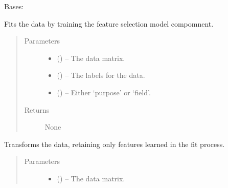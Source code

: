 \documentclass[letterpaper,10pt,english]{sphinxmanual}
\begin{document}
\begin{fulllineitems}
\label{\detokenize{KUHERD:KUHERD.FeatureSelector.FeatureSelector}}
Bases: 

\begin{fulllineitems}
\label{\detokenize{KUHERD:KUHERD.FeatureSelector.FeatureSelector.fit}}
Fits the data by training the feature selection model compomnent.
\begin{quote}\begin{description}
\item[{Parameters}] \leavevmode\begin{itemize}
\item {} 
 () -- The data matrix.

\item {} 
 () -- The labels for the data.

\item {} 
 () -- Either `purpose' or `field'.

\end{itemize}

\item[{Returns}] \leavevmode
None

\end{description}\end{quote}

\end{fulllineitems}


\begin{fulllineitems}
\label{\detokenize{KUHERD:KUHERD.FeatureSelector.FeatureSelector.transform}}
Transforms the data, retaining only features learned in the \sphinxquotedblleft{}fit\sphinxquotedblright{} process.
\begin{quote}\begin{description}
\item[{Parameters}] \leavevmode\begin{itemize}
\item {} 
 () -- The data matrix.


\end{itemize}
\end{description}
\end{quote}
\end{fulllineitems}
\end{fulllineitems}
\end{document}
